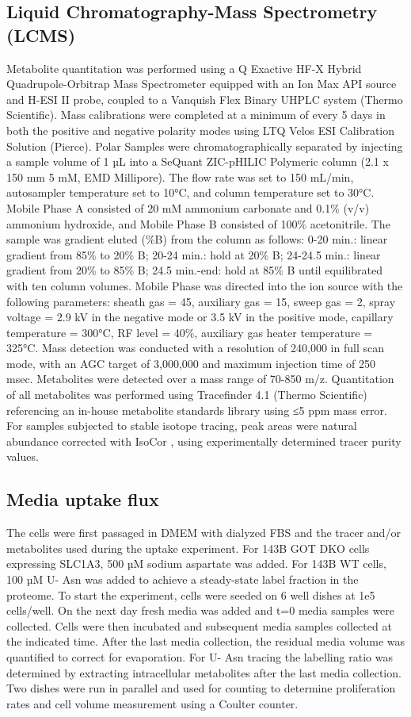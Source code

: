 \subsection{Liquid Chromatography-Mass Spectrometry (LCMS)}
Metabolite quantitation was performed using a Q Exactive HF-X Hybrid Quadrupole-Orbitrap Mass Spectrometer equipped with an Ion Max API source and H-ESI II probe, coupled to a Vanquish Flex Binary UHPLC system (Thermo Scientific).
Mass calibrations were completed at a minimum of every 5 days in both the positive and negative polarity modes using LTQ Velos ESI Calibration Solution (Pierce).
Polar Samples were chromatographically separated by injecting a sample volume of 1 µL into a SeQuant ZIC-pHILIC Polymeric column (2.1 x 150 mm 5 mM, EMD Millipore).
The flow rate was set to 150 mL/min, autosampler temperature set to 10°C, and column temperature set to 30°C.
Mobile Phase A consisted of 20 mM ammonium carbonate and 0.1\% (v/v) ammonium hydroxide, and Mobile Phase B consisted of 100\% acetonitrile.
The sample was gradient eluted (\%B) from the column as follows: 0-20 min.: linear gradient from 85\% to 20\% B; 20-24 min.: hold at 20\% B; 24-24.5 min.: linear gradient from 20\% to 85\% B; 24.5 min.-end: hold at 85\% B until equilibrated with ten column volumes.
Mobile Phase was directed into the ion source with the following parameters: sheath gas = 45, auxiliary gas = 15, sweep gas = 2, spray voltage = 2.9 kV in the negative mode or 3.5 kV in the positive mode, capillary temperature = 300°C, RF level = 40\%, auxiliary gas heater temperature = 325°C.
Mass detection was conducted with a resolution of 240,000 in full scan mode, with an AGC target of 3,000,000 and maximum injection time of 250 msec.
Metabolites were detected over a mass range of 70-850 m/z.
Quantitation of all metabolites was performed using Tracefinder 4.1 (Thermo Scientific) referencing an in-house metabolite standards library using ≤5 ppm mass error.
For samples subjected to stable isotope tracing, peak areas were natural abundance corrected with IsoCor \cite{Millard2019-hv}, using experimentally determined tracer purity values.


\subsection{Media uptake flux}
The cells were first passaged in DMEM with dialyzed FBS and the tracer and/or metabolites used during the uptake experiment.
For 143B GOT DKO cells expressing SLC1A3, 500 µM sodium aspartate was added.
For 143B WT cells, 100 µM U-\hCi{} Asn was added to achieve a steady-state label fraction in the proteome.
To start the experiment, cells were seeded on 6 well dishes at 1e5 cells/well.
On the next day fresh media was added and t=0 media samples were collected.
Cells were then incubated and subsequent media samples collected at the indicated time.
After the last media collection, the residual media volume was quantified to correct for evaporation.
For U-\hCi{} Asn tracing the labelling ratio was determined by extracting intracellular metabolites after the last media collection.
Two dishes were run in parallel and used for counting to determine proliferation rates and cell volume measurement using a Coulter counter.


